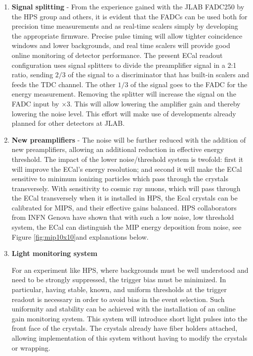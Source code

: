 \begin{enumerate}
\item {\bf Signal splitting} - From the experience gained with the JLAB FADC250 by the HPS group and others, it is evident that the FADCs can be used both for precision time measurements and as 
real-time scalers simply by developing the appropriate firmware.
Precise pulse timing will allow tighter coincidence windows and lower backgrounds, and real time scalers will provide good online monitoring of detector performance. The present ECal readout configuration uses signal splitters to divide the preamplifier signal in  a 2:1 ratio, sending 
$2/3$ of the signal to a discriminator that has built-in scalers and feeds the TDC channel. The other $1/3$ of the 
signal goes to the FADC for the energy measurement. Removing the splitter will increase the signal on the FADC input by $\times 3$. This will allow lowering the amplifier gain and thereby lowering the noise level. This effort will make use of developments already planned for other detectors at JLAB.

 
\item {\bf New preamplifiers} - The noise will be further reduced with the addition of new preamplifiers, allowing an additional reduction in effective energy threshold. The impact of the lower noise/threshold system is twofold: first it 
will improve the ECal's energy resolution; and second it will make the ECal sensitive to minimum ionizing particles which pass through the crystals transversely. With sensitivity to cosmic ray muons, which will pass through the ECal transversely when it is installed in HPS, the Ecal crystals can be calibrated for MIPS, and their effective gains balanced.  HPS collaborators from INFN Genova have shown that with such a low noise, low threshold system, the ECal can distinguish the MIP energy deposition from noise, see Figure \ref{fig:mip10x10}and explanations below.

\item {\bf Light monitoring system}

For an experiment like HPS, where backgrounds must be well understood and need to be strongly suppressed, the trigger bias must be minimized. In particular, having stable, known, and uniform thresholds at the trigger readout is necessary in order to avoid  bias in the 
event selection. Such uniformity and stability can be achieved with the installation of an online gain monitoring 
system. This system will introduce short light pulses into the front face of the crystals. The crystals already have fiber holders attached, allowing implementation of this system without having to modify the crystals or wrapping. 


\end{enumerate}
